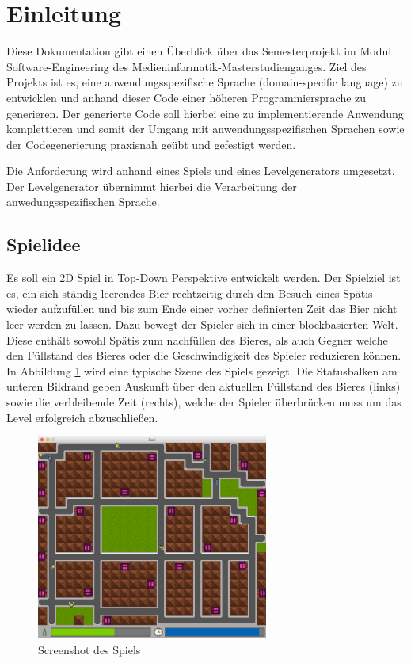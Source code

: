 \section{Einleitung}

Diese Dokumentation gibt einen Überblick über das Semesterprojekt im Modul Software-Engineering des Medieninformatik-Masterstudienganges.
Ziel des Projekts ist es, eine anwendungsspezifische Sprache (domain-specific language) zu entwicklen und anhand dieser Code einer höheren Programmiersprache zu generieren.
Der generierte Code soll hierbei eine zu implementierende Anwendung komplettieren und somit der Umgang mit anwendungsspezifischen Sprachen sowie der Codegenerierung praxisnah geübt und gefestigt werden.

Die Anforderung wird anhand eines Spiels und eines Levelgenerators umgesetzt.
Der Levelgenerator übernimmt hierbei die Verarbeitung der anwedungsspezifischen Sprache.

\subsection{Spielidee}

Es soll ein 2D Spiel in Top-Down Perspektive entwickelt werden.
Der Spielziel ist es, ein sich ständig leerendes Bier rechtzeitig durch den Besuch eines Spätis wieder aufzufüllen und bis zum Ende einer vorher definierten Zeit das Bier nicht leer werden zu lassen.
Dazu bewegt der Spieler sich in einer blockbasierten Welt.
Diese enthält sowohl Spätis zum nachfüllen des Bieres, als auch Gegner welche den Füllstand des Bieres oder die Geschwindigkeit des Spieler reduzieren können.
In Abbildung \ref{fig:einleitung:screenshot} wird eine typische Szene des Spiels gezeigt.
Die Statusbalken am unteren Bildrand geben Auskunft über den aktuellen Füllstand des Bieres (links) sowie die verbleibende Zeit (rechts), welche der Spieler überbrücken muss um das Level erfolgreich abzuschließen.

\begin{figure}[]
\centering
\includegraphics[width=3in]{img/02_screenshot.png}
\caption{Screenshot des Spiels}
\label{fig:einleitung:screenshot}
\end{figure}


